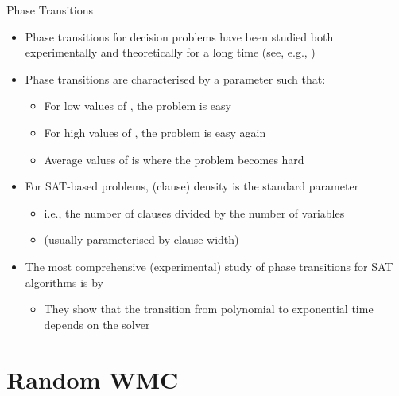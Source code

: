 \documentclass{beamer}
\begin{document}
\begin{frame}{Phase Transitions}
  \begin{itemize}
    \item Phase transitions for \alert{decision problems} have been studied both
          \alert{experimentally} and \alert{theoretically} for a long time (see,
          e.g.,
          \textcolor{gray}{\textcite{DBLP:conf/ijcai/CheesemanKT91}})\pause
    \item Phase transitions are characterised by a parameter 
          such that:
    \begin{itemize}
      \item For \alert{low} values of , the problem is
            \alert{easy}
      \item For \alert{high} values of , the problem is
            \alert{easy} again
      \item \alert{Average} values of  is where the problem
            becomes \alert{hard}\pause
    \end{itemize}
    \item For SAT-based problems, \alert{(clause) density} is the standard
          parameter
          \begin{itemize}
            \item i.e., the number of \alert{clauses} divided by the number of
                  \alert{variables}
            \item (usually parameterised by \alert{clause width})\pause
          \end{itemize}
    \item The most comprehensive (experimental) study of phase transitions for
          \alert{SAT algorithms} is
          by~\textcolor{gray}{\textcite{DBLP:journals/constraints/CoarfaDASV03}}
          \begin{itemize}
            \item They show that the transition from polynomial to exponential
                  time \alert{depends on the solver}
          \end{itemize}
  \end{itemize}
\end{frame}

\section{Random WMC}
\end{document}
